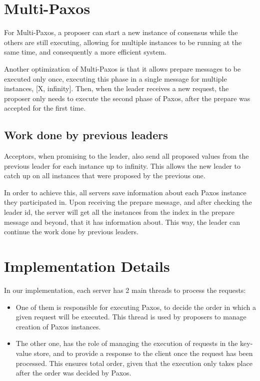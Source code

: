 \documentclass[times, 10pt,twocolumn]{article}
\begin{document}
\section{Multi-Paxos}

For Multi-Paxos, a proposer can start a new instance of consensus while the others are still executing, allowing for multiple instances to be running at the same time, and consequently a more efficient system.

Another optimization of Multi-Paxos is that it allows prepare messages to be executed only once, executing this phase in a single message for multiple instances, [X, infinity]. Then, when the leader receives a new request, the proposer only needs to execute the second phase of Paxos, after the prepare was accepted for the first time.

\subsection{Work done by previous leaders}

Acceptors, when promising to the leader, also send all proposed values from the previous leader for each instance up to infinity. This allows the new leader to catch up on all instances that were proposed by the previous one.

In order to achieve this, all servers save information about each Paxos instance they participated in. Upon receiving the prepare message, and after checking the leader id, the server will get all the instances from the index in the prepare message and beyond, that it has information about. This way, the leader can continue the work done by previous leaders.

\section{Implementation Details}

In our implementation, each server has 2 main threads to process the requests:

\begin{itemize}
    \item One of them is responsible for executing Paxos, to decide the order in which a given request will be executed. This thread is used by proposers to manage creation of Paxos instances.
    \item The other one, has the role of managing the execution of requests in the key-value store, and to provide a response to the client once the request has been processed. This ensures total order, given that the execution only takes place after the order was decided by Paxos.
\end{itemize}
\end{document}
